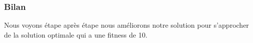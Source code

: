 




\subsubsection{Bilan}

Nous voyons étape après étape nous améliorons notre solution pour s'approcher de la solution optimale qui a une fitness de 10.